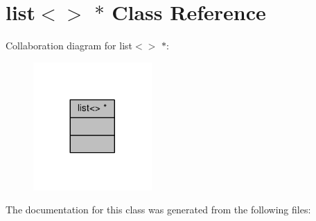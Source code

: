 \hypertarget{classmpl_1_1list_3_4_01_5}{}\section{list$<$$>$ $\ast$ Class Reference}
\label{classmpl_1_1list_3_4_01_5}


Collaboration diagram for list$<$$>$ $\ast$\+:\nopagebreak
\begin{figure}[H]
\begin{center}
\leavevmode
\includegraphics[width=128pt]{classmpl_1_1list_3_4_01_5__coll__graph}
\end{center}
\end{figure}


The documentation for this class was generated from the following files\+: